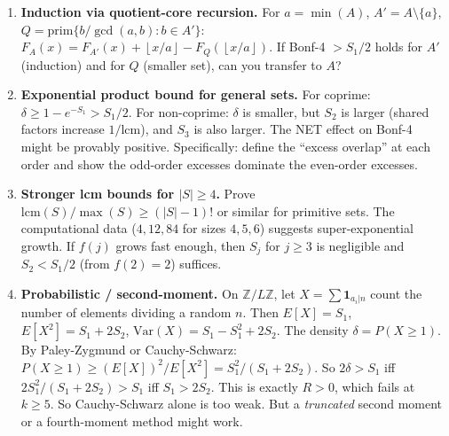 \documentclass[11pt,a4paper]{article}
\theoremstyle{definition}
\newcommand{\floor}[1]{\left\lfloor #1 \right\rfloor}
\begin{document}
\begin{enumerate}
\item \textbf{Induction via quotient-core recursion.} For $a = \min(A)$,
$A' = A \setminus \{a\}$, $Q = \mathrm{prim}\{b/\gcd(a,b) : b \in A'\}$:
$F_A(x) = F_{A'}(x) + \floor{x/a} - F_Q(\floor{x/a})$.
If Bonf-4 $> S_1/2$ holds for $A'$ (induction) and for $Q$ (smaller set),
can you transfer to $A$?

\item \textbf{Exponential product bound for general sets.} For coprime:
$\delta \geq 1 - e^{-S_1} > S_1/2$. For non-coprime: $\delta$ is smaller,
but $S_2$ is larger (shared factors increase $1/\mathrm{lcm}$), and $S_3$
is also larger. The NET effect on Bonf-4 might be provably positive.
Specifically: define the ``excess overlap'' at each order and show the
odd-order excesses dominate the even-order excesses.

\item \textbf{Stronger lcm bounds for $|S| \geq 4$.} Prove
$\mathrm{lcm}(S)/\max(S) \geq (|S|-1)!$ or similar for primitive sets.
The computational data ($4, 12, 84$ for sizes $4, 5, 6$) suggests
super-exponential growth. If $f(j)$ grows fast enough, then $S_j$ for
$j \geq 3$ is negligible and $S_2 < S_1/2$ (from $f(2)=2$) suffices.

\item \textbf{Probabilistic / second-moment.} On $\mathbb{Z}/L\mathbb{Z}$,
let $X = \sum \mathbf{1}_{a_i | n}$ count the number of elements dividing a
random $n$. Then $E[X] = S_1$, $E[X^2] = S_1 + 2S_2$,
$\mathrm{Var}(X) = S_1 - S_1^2 + 2S_2$.
The density $\delta = P(X \geq 1)$. By Paley-Zygmund or Cauchy-Schwarz:
$P(X \geq 1) \geq (E[X])^2/E[X^2] = S_1^2/(S_1 + 2S_2)$.
So $2\delta > S_1$ iff $2S_1^2/(S_1+2S_2) > S_1$ iff $S_1 > 2S_2$.
This is exactly $R > 0$, which fails at $k \geq 5$. So Cauchy-Schwarz
alone is too weak. But a \emph{truncated} second moment or a fourth-moment
method might work.
\end{enumerate}
\end{document}
